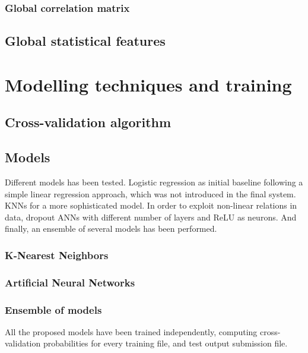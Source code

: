 \documentclass[a4paper,english,twoside]{article}
\begin{document}
\subsubsection{Global correlation
  matrix}\label{global-correlation-matrix}

\subsection{Global statistical
  features}\label{global-statistical-features}

\section{Modelling techniques and
  training}\label{modelling-techniques-and-training}

\subsection{Cross-validation
  algorithm}\label{cross-validation-algorithm}

\subsection{Models}\label{models}

Different models has been tested. Logistic regression as initial
baseline following a simple linear regression approach, which was not
introduced in the final system. KNNs for a more sophisticated model. In
order to exploit non-linear relations in data, dropout ANNs with
different number of layers and ReLU as neurons. And finally, an ensemble
of several models has been performed.

\subsubsection{K-Nearest Neighbors}\label{k-nearest-neighbors}

\subsubsection{Artificial Neural
  Networks}\label{artificial-neural-networks}

\subsubsection{Ensemble of models}\label{ensemble-of-models}

All the proposed models have been trained independently, computing
cross-validation probabilities for every training file, and test output
submission file.
\end{document}

